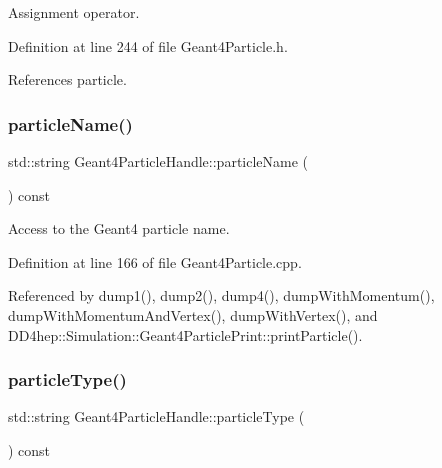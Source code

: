 Assignment operator. 



Definition at line 244 of file Geant4\+Particle.\+h.



References particle.

\hypertarget{class_d_d4hep_1_1_simulation_1_1_geant4_particle_handle_aef52f9ffbf69cb4c8470a400ed6a3e00}{}\label{class_d_d4hep_1_1_simulation_1_1_geant4_particle_handle_aef52f9ffbf69cb4c8470a400ed6a3e00} 
\subsubsection{\texorpdfstring{particle\+Name()}{particleName()}}
{\footnotesize\ttfamily std\+::string Geant4\+Particle\+Handle\+::particle\+Name (\begin{DoxyParamCaption}{ }\end{DoxyParamCaption}) const}



Access to the Geant4 particle name. 



Definition at line 166 of file Geant4\+Particle.\+cpp.



Referenced by dump1(), dump2(), dump4(), dump\+With\+Momentum(), dump\+With\+Momentum\+And\+Vertex(), dump\+With\+Vertex(), and D\+D4hep\+::\+Simulation\+::\+Geant4\+Particle\+Print\+::print\+Particle().

\hypertarget{class_d_d4hep_1_1_simulation_1_1_geant4_particle_handle_af00b1991de98a7749196c9f8097f23a3}{}\label{class_d_d4hep_1_1_simulation_1_1_geant4_particle_handle_af00b1991de98a7749196c9f8097f23a3} 
\subsubsection{\texorpdfstring{particle\+Type()}{particleType()}}
{\footnotesize\ttfamily std\+::string Geant4\+Particle\+Handle\+::particle\+Type (\begin{DoxyParamCaption}{ }\end{DoxyParamCaption}) const}



